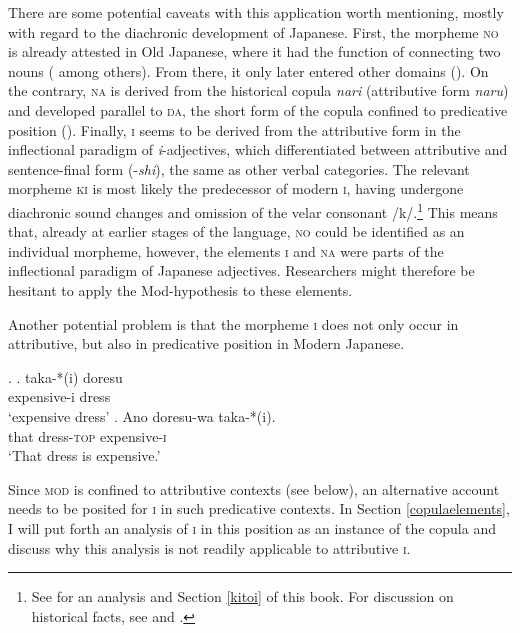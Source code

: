 There are some potential caveats with this application worth mentioning, mostly with regard to the diachronic development of Japanese. First, the morpheme \textsc{no} is already attested in Old Japanese, where it had the function of connecting two nouns (\citealt{frellesvig:2010:history} among others). From there, it only later entered other domains (\citealt{sakurai:1964:meiyo, wenck:1974:systematische}). On the contrary, \textsc{na} is derived from the historical copula \textit{nari} (attributive form \textit{naru}) and developed parallel to \textsc{da}, the short form of the copula confined to predicative position (\citealt{kubo:1992:japanese, urushibara:1993:syntactic, nishiyama:1999:adj, miyama:2011:da}). Finally, \textsc{i} seems to be derived from the attributive form in the inflectional paradigm of \textit{i}-adjectives, which differentiated between attributive and sentence-final form (-\textit{shi}), the same as other verbal categories. The relevant morpheme \textsc{ki} is most likely the predecessor of modern \textsc{i}, having undergone diachronic sound changes and omission of the velar consonant /k/.\footnote{See for an analysis \citet[§ 3.3]{nishiyama:1999:adj} and Section \ref{kitoi} of this book. For discussion on historical facts, see \citet{urushibara:1993:syntactic} and \citet{frellesvig:2010:history}.} This means that, already at earlier stages of the language, \textsc{no} could be identified as an individual morpheme, however, the elements \textsc{i} and \textsc{na} were parts of the inflectional paradigm of Japanese adjectives. Researchers might therefore be hesitant to apply the Mod-hypothesis to these elements.

Another potential problem is that the morpheme \textsc{i} does not only occur in attributive, but also in predicative position in Modern Japanese.

\ex. \ag. taka-*(i) doresu\\
expensive-i dress\\
`expensive dress'
\bg. Ano doresu-wa taka-*(i).\\
that dress-\textsc{top} expensive-\textsc{i}\\
`That dress is expensive.'

Since \textsc{mod} is confined to attributive contexts (see below), an alternative account needs to be posited for \textsc{i} in such predicative contexts. In Section \ref{copulaelements}, I will put forth an analysis of \textsc{i} in this position as an instance of the copula \citep{nishiyama:1999:adj} and discuss why this analysis is not readily applicable to attributive \textsc{i}.

